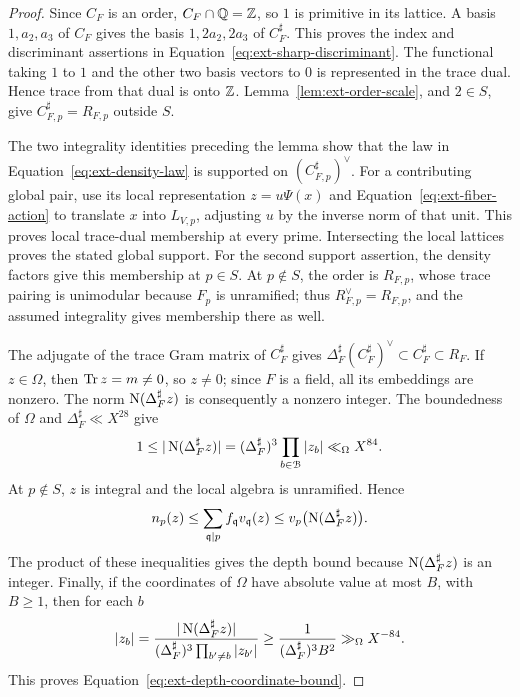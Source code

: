 \begin{proof}
Since \(C_F\) is an order, \(C_F\cap\mathbb Q=\mathbb Z\), so \(1\) is primitive
in its lattice.  A basis \(1,a_2,a_3\) of \(C_F\) gives the basis
\(1,2a_2,2a_3\) of \(C_F^\sharp\).  This proves the index and
discriminant assertions in Equation~\eqref{eq:ext-sharp-discriminant}.
The functional taking \(1\) to \(1\) and the other two basis vectors
to \(0\) is represented in the trace dual.  Hence trace from that
dual is onto \(\mathbb Z\).  Lemma~\ref{lem:ext-order-scale}, and \(2\in S\),
give \(C_{F,p}^\sharp=R_{F,p}\) outside \(S\).

The two integrality identities preceding the lemma show that the
law in Equation~\eqref{eq:ext-density-law} is supported on
\((C_{F,p}^\sharp)^\vee\).  For a contributing global pair, use its local
representation \(z=u\Psi(x)\) and Equation~\eqref{eq:ext-fiber-action}
to translate \(x\) into \(L_{V,p}\), adjusting \(u\) by the inverse
norm of that unit.  This proves local trace-dual membership
at every prime.  Intersecting the local lattices proves the stated
global support.  For the second support assertion, the density factors
give this membership at \(p\in S\).  At \(p\notin S\), the order is
\(R_{F,p}\), whose trace pairing is unimodular because \(F_p\) is
unramified; thus \(R_{F,p}^\vee=R_{F,p}\), and the assumed integrality
gives membership there as well.

The adjugate of the trace Gram matrix of \(C_F^\sharp\) gives
\(\Delta_F^\sharp(C_F^\sharp)^\vee\subset C_F^\sharp\subset R_F\).
If \(z\in\Omega\), then \(\operatorname{Tr} z=m\ne0\), so \(z\ne0\); since \(F\)
is a field, all its embeddings are nonzero.  The norm
\(\operatorname{N}(\Delta_F^\sharp z)\) is consequently a nonzero integer.  The
boundedness of \(\Omega\) and \(\Delta_F^\sharp\ll X^{28}\) give
\[
 1\le|\operatorname{N}(\Delta_F^\sharp z)|
       =(\Delta_F^\sharp)^3\prod_{b\in\mathcal B}|z_b|
       \ll_\Omega X^{84}.
\]
At \(p\notin S\), \(z\) is integral and the local algebra is
unramified.  Hence
\[
 n_p(z)\le\sum_{\mathfrak q\mid p}
               f_{\mathfrak q}v_{\mathfrak q}(z)
       \le v_p\bigl(\operatorname{N}(\Delta_F^\sharp z)\bigr).
\]
The product of these inequalities gives the depth bound because
\(\operatorname{N}(\Delta_F^\sharp z)\) is an integer.  Finally, if the coordinates of
\(\Omega\) have absolute value at most \(B\), with \(B\ge1\), then
for each \(b\)
\[
 |z_b|=\frac{|\operatorname{N}(\Delta_F^\sharp z)|}
              {(\Delta_F^\sharp)^3\prod_{b'\ne b}|z_{b'}|}
       \ge\frac{1}{(\Delta_F^\sharp)^3 B^2}\gg_\Omega X^{-84}.
\]
This proves Equation~\eqref{eq:ext-depth-coordinate-bound}.
\end{proof}
